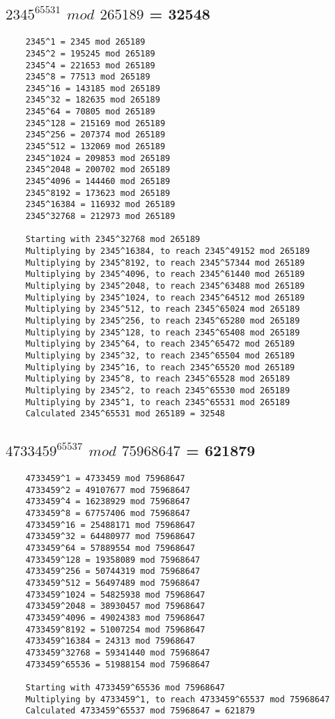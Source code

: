 \documentclass[a4paper,12pt]{article}
\begin{document}
\subsection*{$2345^{65531}$ $mod$ $265189$ = 32548}
\begin{verbatim}
    2345^1 = 2345 mod 265189
    2345^2 = 195245 mod 265189
    2345^4 = 221653 mod 265189
    2345^8 = 77513 mod 265189
    2345^16 = 143185 mod 265189
    2345^32 = 182635 mod 265189
    2345^64 = 70805 mod 265189
    2345^128 = 215169 mod 265189
    2345^256 = 207374 mod 265189
    2345^512 = 132069 mod 265189
    2345^1024 = 209853 mod 265189
    2345^2048 = 200702 mod 265189
    2345^4096 = 144460 mod 265189
    2345^8192 = 173623 mod 265189
    2345^16384 = 116932 mod 265189
    2345^32768 = 212973 mod 265189

    Starting with 2345^32768 mod 265189
    Multiplying by 2345^16384, to reach 2345^49152 mod 265189
    Multiplying by 2345^8192, to reach 2345^57344 mod 265189
    Multiplying by 2345^4096, to reach 2345^61440 mod 265189
    Multiplying by 2345^2048, to reach 2345^63488 mod 265189
    Multiplying by 2345^1024, to reach 2345^64512 mod 265189
    Multiplying by 2345^512, to reach 2345^65024 mod 265189
    Multiplying by 2345^256, to reach 2345^65280 mod 265189
    Multiplying by 2345^128, to reach 2345^65408 mod 265189
    Multiplying by 2345^64, to reach 2345^65472 mod 265189
    Multiplying by 2345^32, to reach 2345^65504 mod 265189
    Multiplying by 2345^16, to reach 2345^65520 mod 265189
    Multiplying by 2345^8, to reach 2345^65528 mod 265189
    Multiplying by 2345^2, to reach 2345^65530 mod 265189
    Multiplying by 2345^1, to reach 2345^65531 mod 265189
    Calculated 2345^65531 mod 265189 = 32548
\end{verbatim}

\subsection*{$4733459^{65537}$ $mod$ $75968647$ = 621879}
\begin{verbatim}
    4733459^1 = 4733459 mod 75968647
    4733459^2 = 49107677 mod 75968647
    4733459^4 = 16238929 mod 75968647
    4733459^8 = 67757406 mod 75968647
    4733459^16 = 25488171 mod 75968647
    4733459^32 = 64480977 mod 75968647
    4733459^64 = 57889554 mod 75968647
    4733459^128 = 19358089 mod 75968647
    4733459^256 = 50744319 mod 75968647
    4733459^512 = 56497489 mod 75968647
    4733459^1024 = 54825938 mod 75968647
    4733459^2048 = 38930457 mod 75968647
    4733459^4096 = 49024383 mod 75968647
    4733459^8192 = 51007254 mod 75968647
    4733459^16384 = 24313 mod 75968647
    4733459^32768 = 59341440 mod 75968647
    4733459^65536 = 51988154 mod 75968647

    Starting with 4733459^65536 mod 75968647
    Multiplying by 4733459^1, to reach 4733459^65537 mod 75968647
    Calculated 4733459^65537 mod 75968647 = 621879
\end{verbatim}
\end{document}
